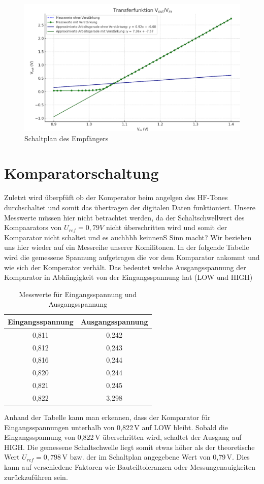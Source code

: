\begin{figure}[H]
    \centering
    \includegraphics[width=1\textwidth]{Pictures/Transferfunktion.png}
    \caption{Schaltplan des Empfängers}
    \label{fig:opamp_schaltung}
\end{figure}


\section{Komparatorschaltung} %
Zuletzt wird überpfüft ob der Komperator beim angelgen des HF-Tones durchschaltet und somit das übertragen der digitalen Daten funktioniert.
Unsere Messwerte müssen hier nicht betrachtet werden, da der Schaltschwellwert des Kompaarators von
$U_{ref}= 0,79V$ nicht überschritten wird und somit der Komparator nicht schaltet und es auchhhh keinnenS Sinn macht?
Wir beziehen uns hier wieder auf ein Messreihe unserer Komilitonen. In der folgende Tabelle wird die gemessene Spannung 
aufgetragen die vor dem Komparator ankommt und wie sich der Komperator verhält. Das bedeutet welche Ausgangsspannung
der Komparator in Abhängigkeit von der Eingangsspannung hat (LOW und HIGH)

\begin{table}[h]
\centering
\begin{tabular}{cc}
\textbf{Eingangsspannung} & \textbf{Ausgangsspannung} \\
\hline
0{,}811 & 0{,}242 \\
0{,}812 & 0{,}243 \\
0{,}816 & 0{,}244 \\
0{,}820 & 0{,}244 \\
0{,}821 & 0{,}245 \\
0{,}822 & 3{,}298 \\
\end{tabular}
\caption{Messwerte für Eingangsspannung und Ausgangsspannung}
\end{table}

Anhand der Tabelle kann man erkennen, dass der Komparator für Eingangsspannungen unterhalb von 0{,}822\,V auf LOW bleibt. Sobald die Eingangsspannung von 0{,}822\,V überschritten wird, schaltet der Ausgang auf HIGH. Die gemessene Schaltschwelle liegt somit etwas höher als der theoretische Wert $U_{ref} = 0{,}798$\,V bzw. der im Schaltplan angegebene Wert von 0{,}79\,V. Dies kann auf verschiedene Faktoren wie Bauteiltoleranzen oder Messungenauigkeiten zurückzuführen sein. 